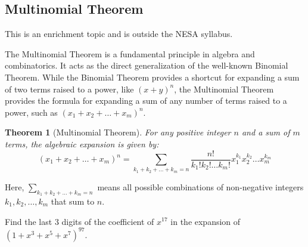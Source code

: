 \documentclass[12pt]{article}
\newtheorem*{theorem}{Theorem}
\newenvironment{remark}[1][]{%
  \begin{remarkbox}[title={\bfseries Remark~\thetcbcounter\ifx\relax#1\relax\else\ (#1)\fi}]%
}{%
  \end{remarkbox}%
}
\begin{document}
\subsection{Multinomial Theorem}
\begin{remark}[Syllabus Note]
This is an enrichment topic and is outside the NESA syllabus.
\end{remark}

The Multinomial Theorem is a fundamental principle in algebra and combinatorics. It acts as the direct generalization of the well-known Binomial Theorem. While the Binomial Theorem provides a shortcut for expanding a sum of two terms raised to a power, like $(x + y)^n$, the Multinomial Theorem provides the formula for expanding a sum of any number of terms raised to a power, such as $(x_1 + x_2 + \dots + x_m)^n$.

\begin{theorem}[Multinomial Theorem]

For any positive integer $n$ and a sum of $m$ terms, the algebraic expansion is given by:
\[
(x_1 + x_2 + \dots + x_m)^n = \sum_{k_1+k_2+\dots+k_m=n} \frac{n!}{k_1!k_2!\dots k_m!} x_1^{k_1} x_2^{k_2} \dots x_m^{k_m}
\]


\end{theorem}

Here, $\sum_{k_1+k_2+\dots+k_m=n}$ means all possible combinations of 
non-negative integers $k_1, k_2, \dots, k_m$ that sum to $n$.


\begin{problembox*}
Find the last 3 digits of the coefficient of $x^{17}$ in the expansion of $(1 + x^3 + x^5 + x^7)^{97}$.
\end{problembox*}
\end{document}
